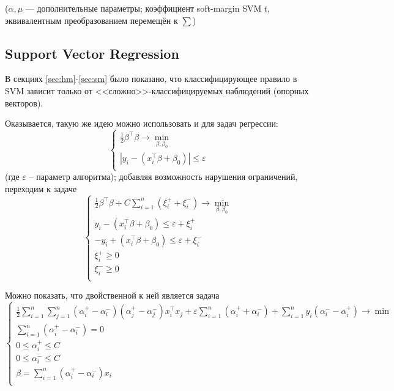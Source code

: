 \documentclass[11pt, a4paper]{article}\usepackage[]{graphicx}\usepackage[]{color}
\begin{document}
    ($\alpha, \mu$ --- дополнительные параметры; коэффициент soft-margin SVM $t$, эквивалентным преобразованием перемещён к $\sum$)

\subsection{Support Vector Regression}
В секциях \ref{sec:hm}-\ref{sec:sm} было показано, что классифицирующее правило в SVM зависит только
от <<сложно>>-классифицируемых наблюдений (опорных векторов).

Оказывается, такую же идею можно использовать и для задач регрессии:
\[
\begin{cases}
\frac{1}{2}\beta^\intercal\beta\rightarrow\min\limits_{\beta,\beta_0}\\
\left\lvert y_i-\left(x_i^\intercal\beta+\beta_0\right)\right\rvert\leq\varepsilon\\
\end{cases}
\]
(где $\varepsilon$ -- параметр алгоритма); добавляя возможность нарушения ограничений,
переходим к задаче
\[
\begin{cases}
\frac{1}{2}\beta^\intercal\beta + C\sum\limits_{i=1}^n\left(\xi_i^++\xi_i^-\right)\rightarrow\min\limits_{\beta,\beta_0}\\
y_i-\left(x_i^\intercal\beta+\beta_0\right)\leq \varepsilon + \xi_i^+ \\
-y_i+\left(x_i^\intercal\beta+\beta_0\right)\leq \varepsilon + \xi_i^- \\
\xi_i^+\geq 0 \\
\xi_i^-\geq 0 \\
\end{cases}
\]

Можно показать, что двойственной к ней является задача
\[
\begin{cases}
\frac{1}{2}\sum\limits_{i=1}^n\sum\limits_{j=1}^n\left(\alpha_i^+-\alpha_i^-\right)\left(\alpha_j^+-\alpha_j^-\right)x_i^\intercal x_j+\varepsilon\sum\limits_{i=1}^n\left(\alpha_i^++\alpha_i^-\right)+\sum\limits_{i=1}^ny_i\left(\alpha_i^--\alpha_i^+\right)\rightarrow\min \\
\sum\limits_{i=1}^n\left(\alpha_i^+-\alpha_i^-\right)=0\\
0\leq\alpha_i^+\leq C \\
0\leq\alpha_i^-\leq C \\
\beta=\sum\limits_{i=1}^n\left(\alpha_i^+-\alpha_i^-\right)x_i \\
\end{cases}
\]
\end{document}
